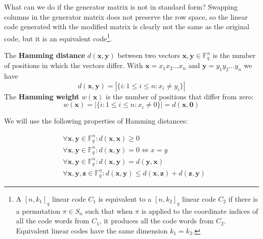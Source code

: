 What can we do if the generator matrix is not in standard form? Swapping columns in the generator matrix does not preserve the row space, so the linear code generated with the modified matrix is clearly not the same as the original code, but it is an equivalent code\footnote{A $[n, k_1]_q$ linear code $C_1$ is equivalent to a $[n, k_2]_q$ linear code $C_2$ if there is a permutation $\pi \in S_n$ such that when $\pi$ is applied to the coordinate indices of all the code words from $C_1$, it produces all the code words from $C_2$. Equivalent linear codes have the same dimension $k_1=k_2$.}. 

\begin{defn}\label{hammingDistDef}
The \textbf{Hamming distance} $d(\bm{x}, \bm{y})$ between two vectors $\bm{x}, \bm{y} \in \mathbb{F}_q^n$ is the number of positions in which the vectors differ. With $\bm{x} = x_1 x_2 \ldots x_n$ and $\bm{y} = y_1 y_2 \ldots y_n$ we have
$$
d(\bm{x}, \bm{y}) = |\{i : 1 \leq i \leq n : x_i \neq y_i\}|
$$
The \textbf{Hamming weight} $w(\bm{x})$ is the number of positions that differ from zero:
$$
w(\bm{x}) = |\{i : 1 \leq i \leq n : x_i \neq 0\}| = d(\bm{x}, \bm{0})
$$
\end{defn}

We will use the following properties of Hamming distances:


\begin{lem}\label{hammingtriangle}
\begin{align*}
&\forall \bm{x}, \bm{y} \in \mathbb{F}_q^n : d(\bm{x}, \bm{x}) \geq 0 \\
&\forall \bm{x}, \bm{y} \in \mathbb{F}_q^n : d(\bm{x}, \bm{y}) = 0 \Leftrightarrow x = y \\
&\forall \bm{x}, \bm{y} \in \mathbb{F}_q^n : d(\bm{x}, \bm{y}) = d(\bm{y}, \bm{x}) \\
&\forall \bm{x}, \bm{y}, \bm{z} \in \mathbb{F}_q^n : d(\bm{x}, \bm{y}) \leq d(\bm{x}, \bm{z}) + d(\bm{z}, \bm{y})
\end{align*}
\end{lem}

